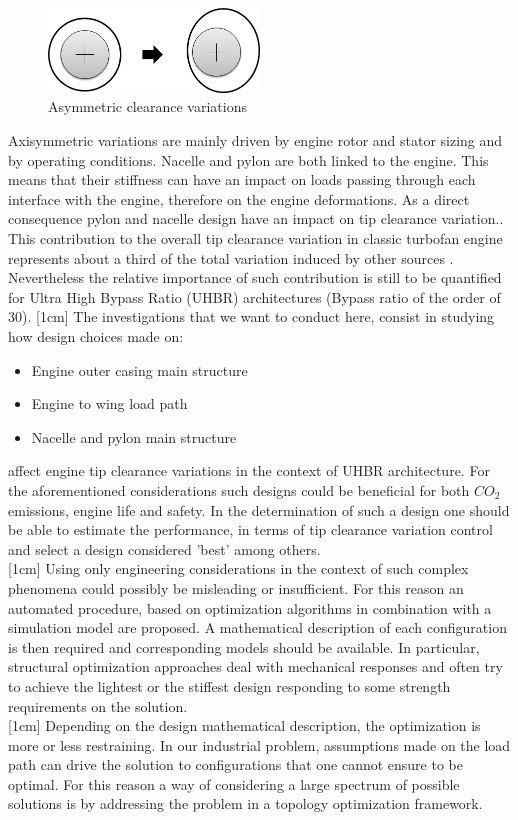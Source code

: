 \begin{figure}[!ht]
\centering   
 \includegraphics[width=0.5\textwidth]{images/intro/asym_tip}
     \caption{Asymmetric clearance variations} 
     \label{fig.intro4}
\end{figure}
Axisymmetric variations are mainly driven by engine rotor and stator sizing and by operating conditions. Nacelle and pylon are both linked to the engine. This means that their stiffness can have an impact on loads passing through each interface with the engine, therefore on the engine deformations. As a direct consequence pylon and nacelle design have an impact on tip clearance variation.\cite{lattime2002turbine}.  This contribution to the overall tip clearance variation in classic turbofan engine represents about a third of the total variation induced by other sources \cite{lattime2002turbine}. Nevertheless the relative importance of such contribution is still to be quantified for Ultra High Bypass Ratio (UHBR) architectures (Bypass ratio of the order of 30).\newpage
{}[1cm] 
 The investigations that we want to conduct here, consist in studying how design choices made on:
 \begin{itemize}
 \item Engine outer casing main structure
 \item Engine to wing load path
 \item Nacelle and pylon main structure
 \end{itemize}
affect engine tip clearance variations in the context of UHBR architecture. For the aforementioned considerations such designs could be beneficial for both $CO_2$ emissions, engine life and safety. 
 In the determination of such a design one should be able to estimate the performance, in terms of tip clearance variation control and select a design considered 'best' among others.\\ 
 [1cm]
 Using only engineering considerations in the context of such complex phenomena could possibly be misleading or insufficient. For this reason an automated procedure, based on optimization algorithms in combination with a simulation model are proposed. A mathematical description of each configuration is then required and corresponding models should be available. In particular, structural optimization approaches deal with mechanical responses and often try to achieve the lightest or the stiffest design responding to some strength requirements on the solution. \\
 [1cm] Depending on the design mathematical description, the optimization is more or less restraining. In our industrial problem, assumptions made on the load path can drive the solution to configurations that one cannot ensure to be optimal. For this reason a way of considering a large spectrum of possible solutions is by addressing the problem in a topology optimization framework. 

